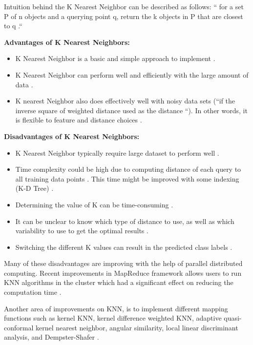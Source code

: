 \documentclass[sigconf]{acmart}
\begin{document}
\par Intuition behind the K Nearest Neighbor can be described as follows: `` for a set P of n objects and a querying point q, return the k objects in P that are closest to q \cite{Lee2017-knn}.``


\textbf{Advantages of K Nearest Neighbors:}
\begin{itemize}
\item K Nearest Neighbor is a basic and simple approach to implement \cite{www-cs.man}.
\item K Nearest Neighbor can perform well and efficiently with the large amount of data \cite{www-revoledu}.
\item K nearest Neighbor also does effectively well with noisy data sets (``if the inverse square of weighted distance used as the distance \cite{www-revoledu}``). In other words, it is flexible to feature and distance choices \cite{www-cs.man}.
\end{itemize}

\textbf{Disadvantages of K Nearest Neighbors:}

\begin{itemize}
\item K Nearest Neighbor typically require large dataset to perform well \cite{www-cs.man}. 
\item Time complexity could be high due to computing distance of each query to all training data points \cite{www-revoledu}. This time might be improved with some indexing (K-D Tree) \cite{www-revoledu}.
\item Determining the value of K can be time-consuming \cite{www-revoledu}. 
\item It can be unclear to know which type of distance to use, as well as which variability to use to get the optimal results \cite{www-revoledu}. 
\item Switching the different K values can result in the predicted class labels \cite{www-nickgillian}. 
\end{itemize}

Many of these disadvantages are improving with the help of parallel distributed computing. Recent improvements in MapReduce framework allows users to run KNN algorithms in the cluster which had a significant effect on reducing the computation time \cite{knn-chung}.

\par Another area of improvements on KNN, is to implement different mapping functions such as kernel KNN, kernel difference weighted KNN, adaptive quasi-conformal kernel nearest neighbor, angular similarity, local linear discriminant analysis, and Dempster-Shafer \cite{ERTUGRUL2017480}. 
\end{document}
